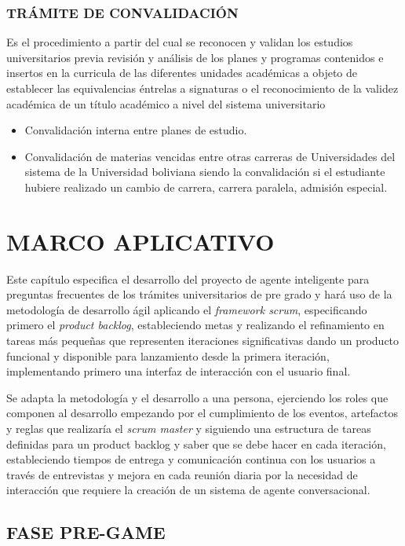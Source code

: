 \documentclass[letter, openright, 12pt]{book}
\begin{document}
\subsection{TRÁMITE DE CONVALIDACIÓN}
Es el procedimiento a partir del cual se reconocen y validan los estudios universitarios previa revisión y análisis de los planes y programas contenidos e insertos en la curricula de las diferentes unidades académicas a objeto de establecer las equivalencias éntrelas a signaturas o el reconocimiento de la validez académica de un título académico a nivel del sistema universitario
\begin{itemize}
\item Convalidación interna entre planes de estudio.
\item Convalidación de materias vencidas entre otras carreras de Universidades del sistema de la Universidad boliviana siendo la convalidación si el estudiante hubiere realizado un cambio de carrera, carrera paralela, admisión especial.
\end{itemize}     


\chapter{MARCO APLICATIVO} 

Este capítulo especifica el desarrollo del proyecto de agente inteligente para preguntas frecuentes de los trámites universitarios de pre grado y hará uso de la metodología de desarrollo ágil aplicando el {\it framework scrum}, especificando primero el {\it product backlog}, estableciendo metas y realizando el refinamiento en tareas más pequeñas que representen iteraciones significativas dando un producto funcional y disponible para lanzamiento desde la primera iteración, implementando primero una interfaz de interacción con el usuario final. \par
Se adapta la metodología y el desarrollo a una persona, ejerciendo los roles que componen al desarrollo empezando por el cumplimiento de los eventos, artefactos y reglas que realizaría el {\it scrum master} y siguiendo una estructura de tareas definidas para un product backlog y saber que se debe hacer en cada iteración, estableciendo tiempos de entrega y comunicación continua con los usuarios a través de entrevistas y mejora en cada reunión diaria por la necesidad de interacción que requiere la creación de un sistema de agente conversacional. 

\section{FASE PRE-GAME}
\end{document}

